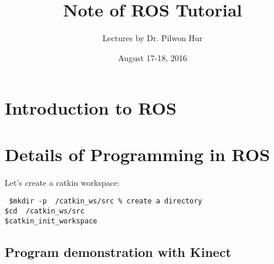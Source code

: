 \documentclass{article}
\title{Note of ROS Tutorial}
\author{Lectures by Dr. Pilwon Hur}
\date{August 17-18, 2016}
\begin{document}
\maketitle
\section{Introduction to ROS}








\section{Details of Programming in ROS}



Let's create a catkin workspace:
\begin{shaded}
\noindent\texttt{\noindent
	\$\quad mkdir -p ~/catkin\_ws/src \quad \% create a directory\\
	 \$\quad cd ~/catkin\_ws/src\\
	 \$\quad catkin\_init\_workspace}	 
\end{shaded}

\subsection{Program demonstration with Kinect}






%
\end{document}
